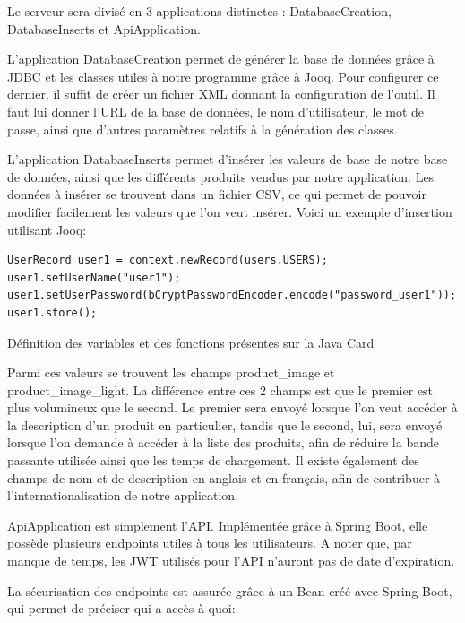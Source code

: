 Le serveur sera divisé en 3 applications distinctes : DatabaseCreation, DatabaseInserts et ApiApplication.

L'application DatabaseCreation permet de générer la base de données grâce à JDBC et les classes utiles à
notre programme grâce à Jooq. Pour configurer ce dernier, il suffit de créer un fichier XML donnant la
configuration de l'outil. Il faut lui donner l'URL de la base de données, le nom d'utilisateur, le mot de
passe, ainsi que d'autres paramètres relatifs à la génération des classes.

L'application DatabaseInserts permet d'insérer les valeurs de base de notre base de données, ainsi que
les différents produits vendus par notre application. Les données à insérer se trouvent dans un fichier
CSV, ce qui permet de pouvoir modifier facilement les valeurs que l'on veut insérer. Voici un exemple
d'insertion utilisant Jooq:

\begin{listing}[H]
    \begin{verbatim}
UserRecord user1 = context.newRecord(users.USERS);
user1.setUserName("user1");
user1.setUserPassword(bCryptPasswordEncoder.encode("password_user1"));
user1.store();
    \end{verbatim}
    \caption{Définition des variables et des fonctions présentes sur la Java Card}
    \label{listing:creation-user1}
\end{listing}

Parmi ces valeurs se trouvent les champs product\_image et product\_image\_light. La différence entre ces
2 champs est que le premier est plus volumineux que le second. Le premier sera envoyé lorsque l'on veut
accéder à la description d'un produit en particulier, tandis que le second, lui, sera envoyé lorsque l'on
demande à accéder à la liste des produits, afin de réduire la bande passante utilisée ainsi que les temps
de chargement. Il existe également des champs de nom et de description en anglais et en français, afin
de contribuer à l'internationalisation de notre application.

ApiApplication est simplement l'API. Implémentée grâce à Spring Boot, elle possède plusieurs endpoints
utiles à tous les utilisateurs. A noter que, par manque de temps, les JWT utilisés pour l'API n'auront pas
de date d'expiration.

La sécurisation des endpoints est assurée grâce à un Bean créé avec Spring Boot, qui permet de préciser qui a accès à quoi:

